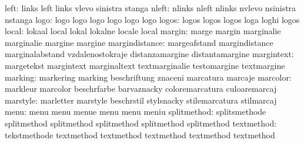                      left: links                     left
                           links                     vlevo
                           sinistra                  stanga
                    nleft: nlinks                    nleft
                           nlinks                    nvlevo
                           nsinistra                 nstanga
                     logo: logo                      logo
                           logo                      logo
                           logo                      logo
                    logos: logos                     logos
                           logos                     loga
                           loghi                     logos
                    local: lokaal                    local
                           lokal                     lokalne
                           locale                    local
                   margin: marge                     margin
                           marginalie                marginalie
                           margine                   margine
           margindistance: margeafstand              margindistance
                           marginalabstand           vzdalenostokraje
                           distanzamargine           distantamargine
               margintext: margetekst                margintext
                           marginaltext              textmarginalie
                           testomargine              textmargine
                  marking: markering                 marking
                           beschriftung              znaceni
                           marcatura                 marcaje
                 marcolor: markleur                  marcolor
                           beschrfarbe               barvaznacky
                           coloremarcatura           culoaremarcaj
                 marstyle: marletter                 marstyle
                           beschrstil                stylsnacky
                           stilemarcatura            stilmarcaj
                     menu: menu                      menu
                           menue                     menu
                           menu                      meniu
              splitmethod: splitsmethode             splitmethod
                           splitmethod               splitmethod
                           splitmethod               splitmethod
               textmethod: tekstmethode              textmethod
                           textmethod                textmethod
                           textmethod                textmethod
